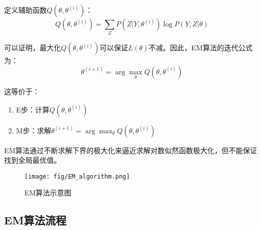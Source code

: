 \documentclass[a4paper,12pt]{ctexart} %
\begin{document}
定义辅助函数$Q(\theta,\theta^{(i)})$：
\begin{equation}
Q(\theta,\theta^{(i)}) = \sum_{Z} P(Z|Y,\theta^{(i)}) \log P(Y,Z|\theta)
\end{equation}

可以证明，最大化$Q(\theta,\theta^{(i)})$可以保证$L(\theta)$不减。因此，EM算法的迭代公式为：
\begin{equation}
\theta^{(i+1)} = \arg\max_{\theta} Q(\theta,\theta^{(i)})
\end{equation}

这等价于：
\begin{enumerate}
    \item E步：计算$Q(\theta,\theta^{(i)})$
    \item M步：求解$\theta^{(i+1)} = \arg\max_{\theta} Q(\theta,\theta^{(i)})$
\end{enumerate}

EM算法通过不断求解下界的极大化来逼近求解对数似然函数极大化，但不能保证找到全局最优值。

\begin{figure}[htbp]
    \centering
    \texttt{[image: fig/EM\_algorithm.png]}
    \caption{EM算法示意图}
    \label{fig:em_algorithm}
\end{figure}

\subsection{EM算法流程}
\end{document}
